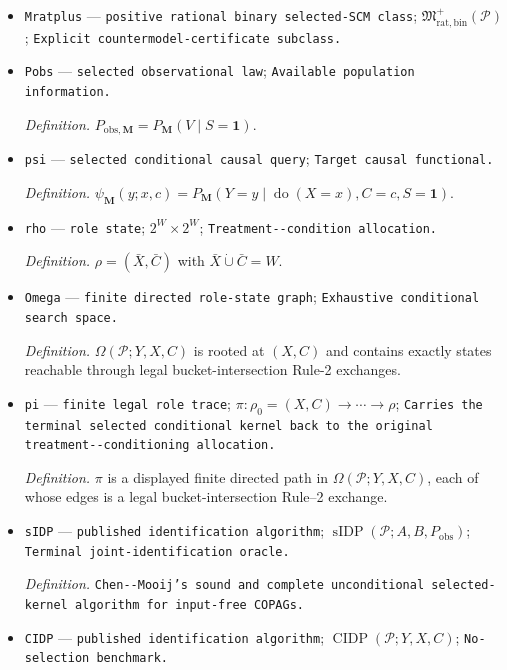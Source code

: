 \documentclass{article}
\begin{document}
\begin{itemize}
  \item \texttt{Mratplus} --- \texttt{positive rational binary selected-\allowbreak{}SCM class}; \(\mathfrak M_{\mathrm{rat,bin}}^+(\mathcal P)\); \texttt{Explicit countermodel-\allowbreak{}certificate subclass.}
  \item \texttt{Pobs} --- \texttt{selected observational law}; \texttt{Available population information.}
  \par\smallskip\noindent\emph{Definition.} \(P_{\mathrm{obs},\mathbf M}=P_{\mathbf M}(V\mid S=\mathbf 1)\).
  \item \texttt{psi} --- \texttt{selected conditional causal query}; \texttt{Target causal functional.}
  \par\smallskip\noindent\emph{Definition.} \(\psi_{\mathbf M}(y;x,c)=P_{\mathbf M}(Y=y\mid\operatorname{do}(X=x),C=c,S=\mathbf 1)\).
  \item \texttt{rho} --- \texttt{role state}; \(2^W\times2^W\); \texttt{Treatment-\allowbreak{}-\allowbreak{}condition allocation.}
  \par\smallskip\noindent\emph{Definition.} \(\rho=(\bar X,\bar C)\) with \(\bar X\mathbin{\dot\cup}\bar C=W\).
  \item \texttt{Omega} --- \texttt{finite directed role-\allowbreak{}state graph}; \texttt{Exhaustive conditional search space.}
  \par\smallskip\noindent\emph{Definition.} \(\Omega(\mathcal P;Y,X,C)\) is rooted at \((X,C)\) and contains exactly states reachable through legal bucket-intersection Rule-2 exchanges.
  \item \texttt{pi} --- \texttt{finite legal role trace}; \(\pi:\rho_0=(X,C)\longrightarrow\cdots\longrightarrow\rho\); \texttt{Carries the terminal selected conditional kernel back to the original treatment-\allowbreak{}-\allowbreak{}conditioning allocation.}
  \par\smallskip\noindent\emph{Definition.} \(\pi\) is a displayed finite directed path in \(\Omega(\mathcal P;Y,X,C)\), each of whose edges is a legal bucket-intersection Rule--2 exchange.
  \item \texttt{sIDP} --- \texttt{published identification algorithm}; \(\operatorname{sIDP}(\mathcal P;A,B,P_{\mathrm{obs}})\); \texttt{Terminal joint-\allowbreak{}identification oracle.}
  \par\smallskip\noindent\emph{Definition.} \texttt{Chen-\allowbreak{}-\allowbreak{}Mooij's sound and complete unconditional selected-\allowbreak{}kernel algorithm for input-\allowbreak{}free COPAGs.}
  \item \texttt{CIDP} --- \texttt{published identification algorithm}; \(\operatorname{CIDP}(\mathcal P;Y,X,C)\); \texttt{No-\allowbreak{}selection benchmark.}

\end{itemize}
\end{document}
